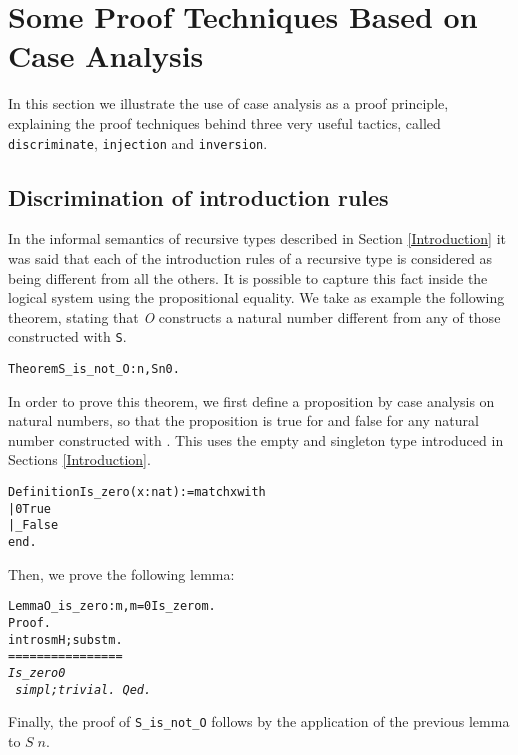 \documentclass[11pt]{article}
\begin{document}
\section{Some Proof Techniques Based on Case Analysis}
\label{CaseTechniques}

In this section we illustrate the use of case analysis as a proof
principle, explaining the proof techniques behind three very useful
{\coq} tactics, called \texttt{discriminate}, \texttt{injection} and
\texttt{inversion}. 

\subsection{Discrimination of introduction rules}
\label{Discrimination}

In the informal semantics of recursive types described in Section
\ref{Introduction} it was said that each of the introduction rules of a
recursive type is considered as being different from all the others. 
It is possible to capture this fact inside the logical system using
the propositional equality. We take as example the following theorem,
stating that \textsl{O} constructs a natural number different 
from any of those constructed with \texttt{S}. 

\begin{alltt}
Theorem S_is_not_O : {\prodsym} n, S n {\coqdiff} 0. 
\end{alltt}

In order to prove this theorem, we first define a proposition by case
analysis on natural numbers, so that the proposition is true for {\Z}
and false for any natural number constructed with {\SUCC}. This uses
the empty and singleton type introduced in Sections \ref{Introduction}.

\begin{alltt}
Definition Is_zero (x:nat):= match x with 
                                     | 0 {\funarrow} True  
                                     | _ {\funarrow} False
                             end.
\end{alltt}

\noindent Then, we prove the following lemma:

\begin{alltt}
Lemma O_is_zero : {\prodsym} m, m = 0 {\arrow} Is_zero m.
Proof.
  intros m H; subst m. 
\it{}
================
 Is_zero 0
\tt{}
simpl;trivial.
Qed.
\end{alltt}

\noindent Finally, the proof of \texttt{S\_is\_not\_O} follows by the
application of the previous lemma to $S\;n$.
\end{document}
